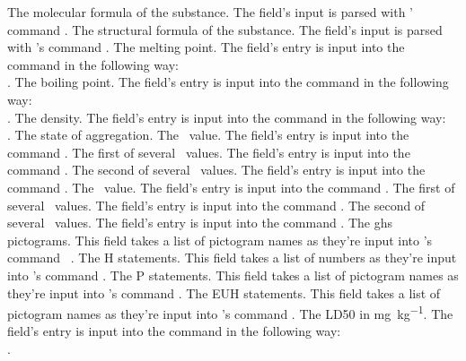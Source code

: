 \documentclass[load-preamble+]{cnltx-doc}
\begin{document}
\begin{options}
    The molecular formula of the substance. The field's input is parsed with
    ' command .
    The structural formula of the substance. The field's input is parsed with
    's command .
    The melting point. The field's entry is input into the 
    command  in the following way: \\
    .
    The boiling point. The field's entry is input into the 
    command  in the following way: \\
    .
    The density. The field's entry is input into the  command
     in the following way: \\
    .
    The state of aggregation.
    The \pKa\ value. The field's entry is input into the  command
    .
    The first of several \pKa\ values. The field's entry is input into the
     command .
    The second of several \pKa\ values. The field's entry is input into the
     command .
    The \pKb\ value. The field's entry is input into the  command
    .
    The first of several \pKb\ values. The field's entry is input into the
     command .
    The second of several \pKb\ values. The field's entry is input into the
     command .
    The \acs{ghs} pictograms. This field takes a list of pictogram names as
    they're input into 's command
    ~\cite{pkg:ghsystem}.
    The H statements. This field takes a list of numbers as they're input into
    's command .
    The P statements. This field takes a list of pictogram names as they're
    input into 's command .
    The EUH statements. This field takes a list of pictogram names as they're
    input into 's command .
    The \ac{LD50} in \si{\milli\gram\per\kilo\gram}. The field's entry is
    input into the  command  in the following way: \\
    .
\end{options}
\end{document}
